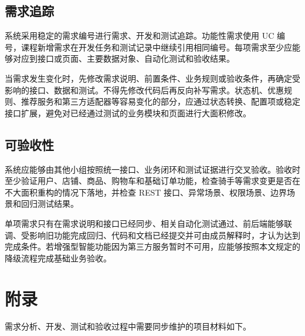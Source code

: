 \subsection{需求追踪}

系统采用稳定的需求编号进行需求、开发和测试追踪。功能性需求使用 UC 编号，课程新增需求在开发任务和测试记录中继续引用相同编号。每项需求至少应能够对应到接口或页面、主要数据对象、自动化测试和验收结果。

当需求发生变化时，先修改需求说明、前置条件、业务规则或验收条件，再确定受影响的接口、数据和测试。不得先修改代码后再反向补写需求。状态机、优惠规则、推荐服务和第三方适配器等容易变化的部分，应通过状态转换、配置项或稳定接口扩展，避免对已经通过测试的业务模块和页面进行大面积修改。

\subsection{可验收性}

系统应能够由其他小组按照统一接口、业务闭环和测试证据进行交叉验收。验收时至少验证用户、店铺、商品、购物车和基础订单功能，检查骑手等需求变更是否在不大面积重构的情况下落地，并检查 REST 接口、异常场景、权限场景、边界场景和回归测试结果。

单项需求只有在需求说明和接口已经同步、相关自动化测试通过、前后端能够联调、受影响旧功能完成回归、代码和文档已经提交并可由成员解释时，才认为达到完成条件。若增强型智能功能因为第三方服务暂时不可用，应能够按照本文规定的降级流程完成基础业务验收。

\section{附录}

需求分析、开发、测试和验收过程中需要同步维护的项目材料如下。

